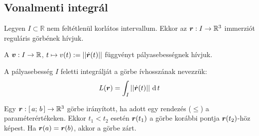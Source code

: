 \documentclass[main.tex]{subfiles}
\begin{document}
\pagebreak
{}
\pagebreak

\subsection{Vonalmenti integrál}


Legyen $I \subset \mathbb{R}$ nem feltétlenül korlátos intervallum.
Ekkor az $\bm{r} : I \rightarrow \mathbb{R}^3$ immerziót
reguláris görbének hívjuk.




A $\bm{v} : I \rightarrow \mathbb{R}$,
$t \mapsto v(t) := \left|\left| \dot{\bm{r}}(t) \right|\right|$
függvényt pályasebességnek hívjuk.




A pályasebesség $I$ feletti integrálját a
görbe ívhosszának nevezzük:
\begin{equation*}
  L(\rvec{r}) = \int_I \norma{\dot{\rvec{r}}(t)} \, \differential \, t
\end{equation*}




Egy $\bm{r} : [ \, a; \, b \,] \rightarrow \mathbb{R}^3$ görbe
irányított, ha adott egy rendezés ($\leq$) a paraméterértékeken.
Ekkor $t_1 < t_2$ esetén $\bm{r}(t_1)$ a görbe korábbi
pontja $\bm{r}(t_2)$-höz képest. Ha $\bm{r}(a) = \bm{r}(b)$,
akkor a görbe zárt.



\end{document}
